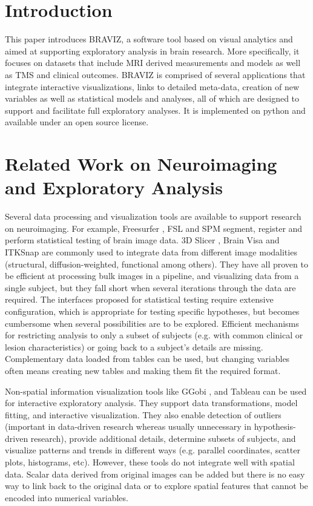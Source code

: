 \documentclass{frontiersHLTH}
\begin{document}
\section{Introduction}

This paper introduces BRAVIZ, a software tool based on visual analytics and aimed at supporting exploratory analysis in brain research. More specifically, it focuses on datasets that include MRI derived measurements and models 
as well as TMS and clinical outcomes. BRAVIZ is comprised of several applications that integrate interactive visualizations, links to detailed meta-data, creation of new variables as well as statistical models and analyses, all of which are designed to support and facilitate full exploratory analyses. It is implemented on python and available under an open source license.

\section{Related Work on Neuroimaging and Exploratory Analysis}


Several data processing and visualization tools are available to support research on neuroimaging. For example, Freesurfer \cite{fischl_freesurfer_2012}, FSL \cite{jenkinson_fsl_2012} and SPM \cite{friston_statistical_2006} segment, register and perform statistical testing of brain image data. 3D Slicer \cite{fedorov_3d_2012}, Brain Visa \cite{cointepas_brainvisa:_2001} and ITKSnap \cite{yushkevich_user-guided_2006} are commonly used to integrate data from different image modalities (structural, diffusion-weighted, functional among others). They have all proven to be efficient at processing bulk images in a pipeline, and visualizing data from a single subject, but they fall short when several iterations through the data are required. The interfaces proposed for statistical testing require extensive configuration, which is appropriate for testing specific hypotheses, but becomes cumbersome when several possibilities are to be explored. Efficient mechanisms for restricting analysis to only a subset of subjects   (e.g. with common clinical or lesion characteristics) or going back to a subject's details are missing. Complementary data loaded from tables can be used, but changing variables often means creating new tables and making them fit the required format.


Non-spatial information visualization tools like GGobi \cite{cook_interactive_2007}, and Tableau\cite{hanrahan_tableau_2003} can be used for interactive exploratory analysis. They support data transformations, model fitting, and interactive visualization. They also enable  detection of outliers (important in data-driven research whereas usually unnecessary in hypothesis-driven research), provide additional details, determine subsets of subjects, and visualize patterns and trends in different ways (e.g. parallel coordinates, scatter plots, histograms, etc). However, these tools do not integrate well with spatial data. Scalar data derived from original images can be added but there is no easy way to link back to the original data or to explore spatial features that cannot be encoded into numerical variables.
\end{document}
